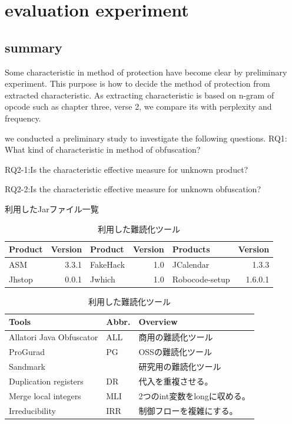 \documentclass[conference]{IEEEtran}
\begin{document}
\section{evaluation experiment}
\subsection{summary}
Some characteristic in method of protection have become clear by preliminary experiment.
This purpose is how to decide the method of protection from extracted characteristic.
As extracting characteristic is based on n-gram of opcode such as 
chapter three, verse 2, 
we compare its with perplexity and frequency.

we conducted a preliminary study to investigate the following questions.
RQ1: What kind of characteristic in method of obfuscation? 

RQ2-1:Is the characteristic effective measure for unknown product?

RQ2-2:Is the characteristic effective measure for unknown obfuscation?

\begin{table}[t]
  \centering
  \footnotesize{
    \caption{利用したJarファイル一覧}\label{table:jars}
  \begin{tabular}{l|r||l|r||l|r}
    Product & Version & Product & Version & Products & Version \\ \hline
    ASM       & 3.3.1 & FakeHack  & 1.0 &JCalendar & 1.3.3   \\
    Jhstop    & 0.0.1 & Jwhich    & 1.0   & Robocode-setup & 1.6.0.1 
  \end{tabular}
  \caption{利用した難読化ツール}\label{table:tools}
  \begin{tabular}{ll|l}
      Tools & Abbr. & Overview \\ \hline
      Allatori Java Obfuscator & ALL & 商用の難読化ツール \\ \hline
      ProGurad                 & PG & OSSの難読化ツール \\ \hline
      Sandmark                 & & 研究用の難読化ツール \\
      \hspace{0.2cm} Duplication registers & DR & 代入を重複させる。\\
      \hspace{0.2cm} Merge local integers & MLI & 2つのint変数をlongに収める。\\
      \hspace{0.2cm} Irreducibility       & IRR & 制御フローを複雑にする。\\
  \end{tabular}}
\end{table}
\end{document}
